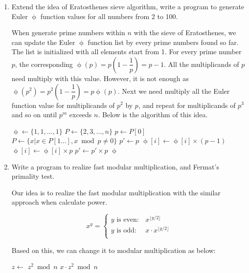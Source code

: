 \documentclass[UTF8]{article}
\begin{document}
\begin{enumerate}
\item{Extend the idea of Eratosthenes sieve algorithm, write a program to generate Euler $\upphi$ function values for all numbers from 2 to 100.}

When generate prime numbers within $n$ with the sieve of Eratosthenes, we can update the Euler $\upphi$ function list by every prime numbers found so far. The list is initialized with all elements start from 1. For every prime number $p$, the corresponding $\upphi(p) = p(1 - \dfrac{1}{p}) = p - 1$. All the multiplicands of $p$ need multiply with this value. However, it is not enough as $\upphi(p^2) = p^2(1 - \dfrac{1}{p}) = p \upphi(p)$. Next we need multiply all the Euler function value for multiplicands of $p^2$ by $p$, and repeat for multiplicands of $p^3$ and so on until $p^m$ exceeds $n$. Below is the algorithm of this idea.

\begin{algorithmic}
  \State $\upphi \gets \{1, 1, ..., 1\}$ 
  \State $P \gets \{2, 3, ..., n\}$ 
    \State $p \gets P[0]$
    \State $P \gets \{x | x \in P[1...], x \bmod p \neq 0\}$
    \State $p' \gets p$
    \Repeat
          \State $\upphi[i] \gets \upphi[i] \times (p - 1)$
        \Else
          \State $\upphi[i] \gets \upphi[i] \times p$
        \EndIf
      \EndFor
      \State $p' \gets p' \times p$
  \EndWhile
  \State \Return $\upphi$
\EndFunction
\end{algorithmic}

\item {Write a program to realize fast modular multiplication, and Fermat's primality test.}

Our idea is to realize the fast modular multiplication with the similar approach when calculate power.

\[
x^y =
\begin{cases}
y \text{ is even}: & x^{\lfloor y / 2 \rfloor} \\
y \text{ is odd}: & x \cdot x^{\lfloor y / 2 \rfloor} \\
\end{cases}
\]

Based on this, we can change it to modular multiplication as below:

\begin{algorithmic}
    \State {}
  \EndIf
  \State $z \gets$ 
    \State \Return $z^2 \bmod n$
  \Else
    \State \Return $x \cdot z^2 \bmod n$
  \EndIf
\EndFunction
\end{algorithmic}


\end{enumerate}
\end{document}
